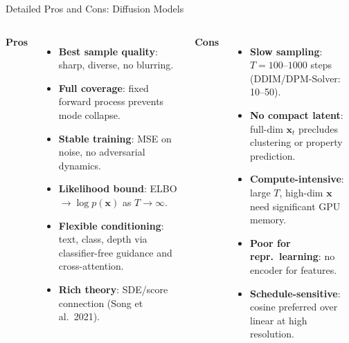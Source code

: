 \documentclass[aspectratio=169,11pt]{beamer}
\newcommand{\bx}{\bm{x}}
\begin{document}
\begin{frame}{Detailed Pros and Cons: Diffusion Models}
\begin{columns}[T]
\textcolor{green!60!black}{\textbf{Pros}}
\begin{itemize}\footnotesize\setlength\itemsep{2pt}
  \item \textbf{Best sample quality}: sharp, diverse, no blurring.
  \item \textbf{Full coverage}: fixed forward process prevents mode collapse.
  \item \textbf{Stable training}: MSE on noise, no adversarial dynamics.
  \item \textbf{Likelihood bound}: ELBO $\to\log p(\bx)$ as $T\to\infty$.
  \item \textbf{Flexible conditioning}: text, class, depth via
        classifier-free guidance and cross-attention.
  \item \textbf{Rich theory}: SDE/score connection (Song et al.\ 2021).
\end{itemize}

\textcolor{red!60!black}{\textbf{Cons}}
\begin{itemize}\footnotesize\setlength\itemsep{2pt}
  \item \textbf{Slow sampling}: $T\!=\!100$--$1000$ steps
        (DDIM/DPM-Solver: 10--50).
  \item \textbf{No compact latent}: full-dim $\bx_t$ precludes clustering
        or property prediction.
  \item \textbf{Compute-intensive}: large $T$, high-dim $\bx$ need
        significant GPU memory.
  \item \textbf{Poor for repr.\ learning}: no encoder for features.
  \item \textbf{Schedule-sensitive}: cosine preferred over linear
        at high resolution.
\end{itemize}
\end{columns}
\end{frame}
\end{document}
